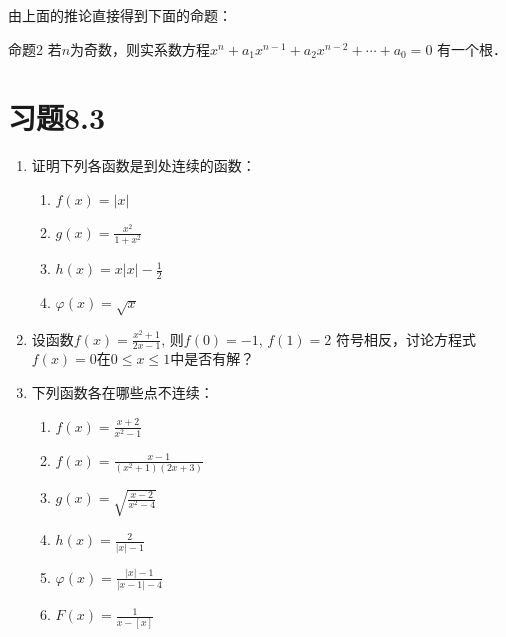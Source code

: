 由上面的推论直接得到下面的命题：
\begin{blk}{命题2}
    若$n$为奇数，则实系数方程$x^n+a_1x^{n-1}+a_2x^{n-2}+\cdots+a_0=0$
有一个根． 
\end{blk}

\section*{习题8.3}
\begin{enumerate}
    \item 证明下列各函数是到处连续的函数：
\begin{multicols}{2}
\begin{enumerate}
    \item $f(x)=|x|$
    \item $g(x)=\frac{x^2}{1+x^2}$
    \item $h(x)=x|x|-\frac{1}{2}$
    \item $\varphi(x)=\sqrt{x}$
\end{enumerate}
\end{multicols}

\item 设函数$f(x)=\frac{x^2+1}{2x-1}$, 
则$f(0)=-1$, $f(1)=2$
符号相反，讨论方程式$f(x)=0$在$0\le x\le 1$中是否有解？
\item 下列函数各在哪些点不连续：
\begin{multicols}{2}
\begin{enumerate}
    \item $f(x)=\frac{x+2}{x^2-1}$
    \item $f(x)=\frac{x-1}{(x^2+1)(2x+3)}$
    \item $g(x)=\sqrt{\frac{x-2}{x^2-4}}$
    \item $h(x)=\frac{2}{|x|-1}$
    \item $\varphi(x)=\frac{|x|-1}{|x-1|-4}$
    \item $F(x)=\frac{1}{x-[x]}$
\end{enumerate}
\end{multicols}


\end{enumerate}
